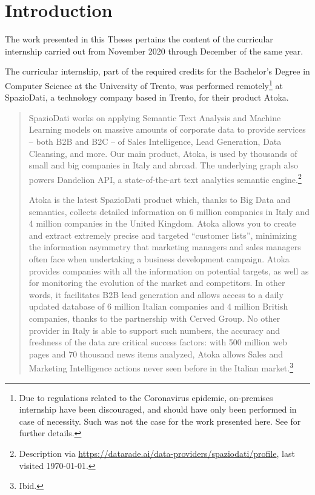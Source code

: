 \chapter{Introduction}
\label{ch:intro}

The work presented in this Theses pertains the content of the curricular internship carried out from November 2020 through December of the same year.

The curricular internship, part of the required credits for the Bachelor's Degree in Computer Science at the University of Trento, was performed remotely\footnote{%
Due to regulations related to the Coronavirus epidemic, on-premises internship have been discouraged, and should have only been performed in case of necessity. Such was not the case for the work presented here. See \cite{faq-covid} for further details.}
at SpazioDati, a technology company based in Trento, for their product Atoka.

\begin{quote}
SpazioDati works on applying Semantic Text Analysis and Machine Learning models on massive amounts of corporate data to provide services -- both B2B and B2C -- of Sales Intelligence, Lead Generation, Data Cleansing, and more.
Our main product, Atoka, is used by thousands of small and big companies in Italy and abroad. The underlying graph also powers Dandelion API, a state-of-the-art text analytics semantic engine.\footnote{%
Description via \url{https://datarade.ai/data-providers/spaziodati/profile}, last visited \today.
}

Atoka is the latest SpazioDati product which, thanks to Big Data and semantics, collects detailed information on 6 million companies in Italy and 4 million companies in the United Kingdom.
Atoka allows you to create and extract extremely precise and targeted ``customer lists'', minimizing the information asymmetry that marketing managers and sales managers often face when undertaking a business development campaign.
Atoka provides companies with all the information on potential targets, as well as for monitoring the evolution of the market and competitors.
In other words, it facilitates B2B lead generation and allows access to a daily updated database of 6 million Italian companies and 4 million British companies, thanks to the partnership with Cerved Group.
No other provider in Italy is able to support such numbers, the accuracy and freshness of the data are critical success factors: with 500 million web pages and 70 thousand news items analyzed, Atoka allows Sales and Marketing Intelligence actions never seen before in the Italian market.\footnote{%
Ibid.
}
\end{quote}


